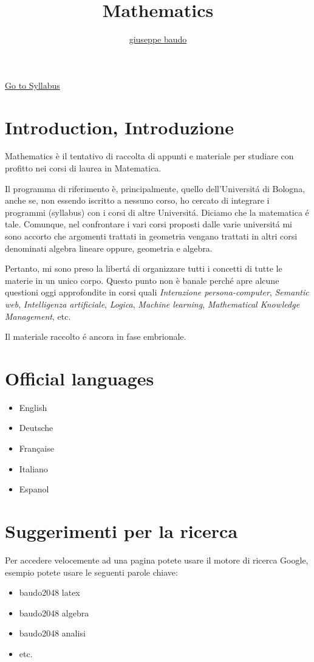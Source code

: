 \documentclass[a4paper,10pt]{article}
\title{Mathematics}
\author{\href{http://www.baudo.hol.es}{giuseppe baudo}}
\begin{document}
	
	\maketitle
	
	\href{Syllabus.html}{Go to Syllabus}
	
	\section{Introduction, Introduzione}		
	Mathematics è il tentativo di raccolta di appunti e materiale per studiare con profitto nei corsi di laurea in Matematica.
	
	Il programma di riferimento \`{e}, principalmente, quello dell'Universit\'{a}
	di Bologna, anche se, non essendo iscritto a nessuno corso, ho cercato di integrare i programmi (syllabus) con i corsi di altre Universit\'{a}. Diciamo che la matematica \'{e} tale.
	Comunque, nel confrontare i vari corsi proposti dalle varie universit\'{a} mi sono accorto che argomenti trattati in geometria vengano trattati in altri corsi denominati algebra lineare oppure, geometria e algebra.
	
	Pertanto, mi sono preso la libert\'{a} di organizzare tutti i concetti di tutte le materie in un unico corpo. Questo punto non \`{e} banale perch\'{e} apre alcune questioni oggi
	approfondite in corsi quali \textit{Interazione persona-computer}, \textit{Semantic web}, \textit{Intelligenza artificiale}, \textit{Logica}, \textit{Machine learning}, \textit{Mathematical Knowledge Management}, etc.
	
	Il materiale raccolto \'{e} ancora in fase embrionale. 
	
	\section{Official languages}
		\begin{itemize}
			\item English
			\item Deutsche
			\item Fran\c{c}aise
			\item Italiano
			\item Espanol
		\end{itemize}
	
	\section{Suggerimenti per la ricerca}
		Per accedere velocemente ad una pagina potete usare il motore di ricerca Google, esempio potete usare le seguenti parole chiave:
		\begin{itemize}
			\item baudo2048 latex
			\item baudo2048 algebra
			\item baudo2048 analisi
			\item etc.
		\end{itemize}
	
\end{document}
